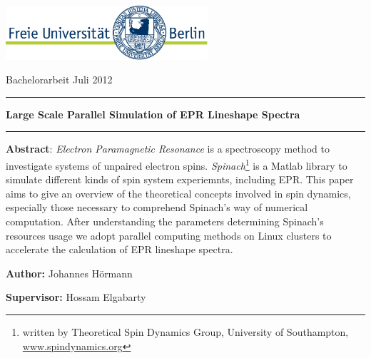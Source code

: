 \documentclass[11.5pt,a4paper]{article}
\begin{document}
\setlength{\parindent}{0pt} %


\thispagestyle{empty}

\includegraphics[height=2cm]{FULogo.jpg}
\hfill %
\parbox[b]{0.5\textwidth}{{\large Bachelorarbeit Juli 2012\\}}

\vspace{2cm}

\begin{center}

\rule[11pt]{15cm}{0.5pt}

{ \textbf {\Large Large Scale Parallel Simulation of EPR Lineshape Spectra}}

\rule{15cm}{0.5pt}

\vspace{1cm}

\parbox{15cm}{\small
\textbf{Abstract}: \emph{Electron Paramagnetic Resonance} is a spectroscopy method to investigate systems of unpaired electron spins. \emph{Spinach}\footnote{written by Theoretical Spin Dynamics Group, University of Southampton, \url{www.spindynamics.org}} is a Matlab library to simulate different kinds of spin system experiemnts, including EPR. This paper aims to give an overview of the theoretical concepts involved in spin dynamics, especially those necessary to comprehend  Spinach's way of numerical computation. After understanding the parameters determining Spinach's resources usage we adopt parallel computing methods on Linux clusters to accelerate the calculation of EPR lineshape spectra.  }

\vspace{0.5cm}

\end{center}

\vspace{1cm}

\large{

{\bf Author:}  Johannes H\"ormann}
\vspace{0.3cm}

{\bf Supervisor:} Hossam Elgabarty
\end{document}

